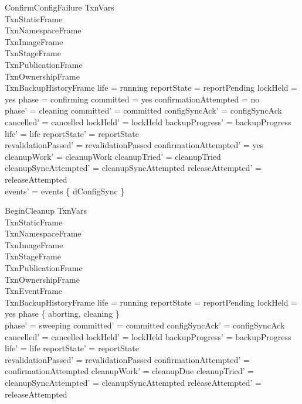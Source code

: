\documentclass{article}
\begin{document}
\begin{schema}{ConfirmConfigFailure}
	\Delta TxnVars \\
	TxnStaticFrame \\
	TxnNamespaceFrame \\
	TxnImageFrame \\
	TxnStageFrame \\
	TxnPublicationFrame \\
	TxnOwnershipFrame \\
	TxnBackupHistoryFrame
	\where
	life = running \land reportState = reportPending \land lockHeld = yes \land
	phase = confirming \land committed = yes \land confirmationAttempted = no \\
	phase' = cleaning \land committed' = committed \land
	configSyncAck' = configSyncAck \land cancelled' = cancelled \land
	lockHeld' = lockHeld \land backupProgress' = backupProgress \land
	life' = life \land reportState' = reportState \\
	revalidationPassed' = revalidationPassed \land confirmationAttempted' = yes \land
	cleanupWork' = cleanupWork \land cleanupTried' = cleanupTried \land
	cleanupSyncAttempted' = cleanupSyncAttempted \land releaseAttempted' = releaseAttempted \\
	events' = events \cup \{ dConfigSync \}
\end{schema}

\begin{schema}{BeginCleanup}
	\Delta TxnVars \\
	TxnStaticFrame \\
	TxnNamespaceFrame \\
	TxnImageFrame \\
	TxnStageFrame \\
	TxnPublicationFrame \\
	TxnOwnershipFrame \\
	TxnEventFrame \\
	TxnBackupHistoryFrame
	\where
	life = running \land reportState = reportPending \land lockHeld = yes \land
	phase \in \{ aborting, cleaning \} \\
	phase' = sweeping \land committed' = committed \land
	configSyncAck' = configSyncAck \land cancelled' = cancelled \land
	lockHeld' = lockHeld \land backupProgress' = backupProgress \land
	life' = life \land reportState' = reportState \\
	revalidationPassed' = revalidationPassed \land
	confirmationAttempted' = confirmationAttempted \land
	cleanupWork' = cleanupDue \land cleanupTried' = \emptyset \land
	cleanupSyncAttempted' = cleanupSyncAttempted \land
	releaseAttempted' = releaseAttempted
\end{schema}
\end{document}
